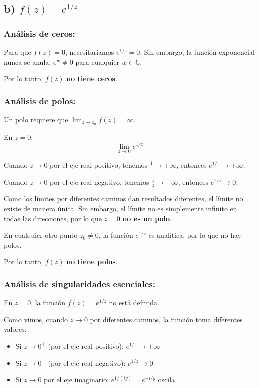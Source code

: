 \documentclass{article}
\begin{document}
\subsection*{b) $f(z) = e^{1/z}$}

\subsubsection*{Análisis de ceros:}

Para que $f(z) = 0$, necesitaríamos $e^{1/z} = 0$. Sin embargo, la función exponencial nunca se anula: $e^w \neq 0$ para cualquier $w \in \mathbb{C}$.

Por lo tanto, $f(z)$ \textbf{no tiene ceros}.

\subsubsection*{Análisis de polos:}

Un polo requiere que $\lim_{z \to z_0} f(z) = \infty$. 

En $z = 0$:
$$\lim_{z \to 0} e^{1/z}$$

Cuando $z \to 0$ por el eje real positivo, tenemos $\frac{1}{z} \to +\infty$, entonces $e^{1/z} \to +\infty$.

Cuando $z \to 0$ por el eje real negativo, tenemos $\frac{1}{z} \to -\infty$, entonces $e^{1/z} \to 0$.

Como los límites por diferentes caminos dan resultados diferentes, el límite no existe de manera única. Sin embargo, el límite no es simplemente infinito en todas las direcciones, por lo que $z = 0$ \textbf{no es un polo}.

En cualquier otro punto $z_0 \neq 0$, la función $e^{1/z}$ es analítica, por lo que no hay polos.

Por lo tanto, $f(z)$ \textbf{no tiene polos}.

\subsubsection*{Análisis de singularidades esenciales:}

En $z = 0$, la función $f(z) = e^{1/z}$ no está definida.

Como vimos, cuando $z \to 0$ por diferentes caminos, la función toma diferentes valores:
\begin{itemize}
\item Si $z \to 0^+$ (por el eje real positivo): $e^{1/z} \to +\infty$
\item Si $z \to 0^-$ (por el eje real negativo): $e^{1/z} \to 0$
\item Si $z \to 0$ por el eje imaginario: $e^{1/(iy)} = e^{-i/y}$ oscila
\end{itemize}
\end{document}
